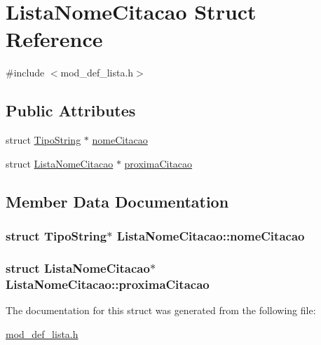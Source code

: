 \hypertarget{structListaNomeCitacao}{\section{Lista\+Nome\+Citacao Struct Reference}
\label{structListaNomeCitacao}
}


{\ttfamily \#include $<$mod\+\_\+def\+\_\+lista.\+h$>$}

\subsection*{Public Attributes}
\begin{DoxyCompactItemize}
\item 
struct \hyperlink{structTipoString}{Tipo\+String} $\ast$ \hyperlink{structListaNomeCitacao_a3f334aaf52169a6ce61a572d26d5fcd6}{nome\+Citacao}
\item 
struct \hyperlink{structListaNomeCitacao}{Lista\+Nome\+Citacao} $\ast$ \hyperlink{structListaNomeCitacao_a632ef3d1dbe6fb8425953da95bdca211}{proxima\+Citacao}
\end{DoxyCompactItemize}


\subsection{Member Data Documentation}
\hypertarget{structListaNomeCitacao_a3f334aaf52169a6ce61a572d26d5fcd6}{
\subsubsection[{nome\+Citacao}]{\setlength{\rightskip}{0pt plus 5cm}struct {\bf Tipo\+String}$\ast$ Lista\+Nome\+Citacao\+::nome\+Citacao}}\label{structListaNomeCitacao_a3f334aaf52169a6ce61a572d26d5fcd6}
\hypertarget{structListaNomeCitacao_a632ef3d1dbe6fb8425953da95bdca211}{
\subsubsection[{proxima\+Citacao}]{\setlength{\rightskip}{0pt plus 5cm}struct {\bf Lista\+Nome\+Citacao}$\ast$ Lista\+Nome\+Citacao\+::proxima\+Citacao}}\label{structListaNomeCitacao_a632ef3d1dbe6fb8425953da95bdca211}


The documentation for this struct was generated from the following file\+:\begin{DoxyCompactItemize}
\item 
\hyperlink{mod__def__lista_8h}{mod\+\_\+def\+\_\+lista.\+h}\end{DoxyCompactItemize}
